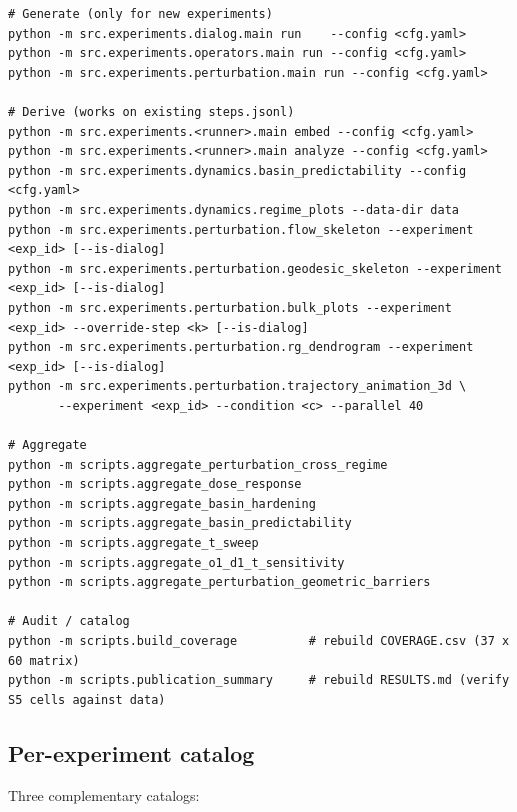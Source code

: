 \documentclass{article}
\theoremstyle{plain}
\theoremstyle{definition}
\begin{document}
\begin{verbatim}
# Generate (only for new experiments)
python -m src.experiments.dialog.main run    --config <cfg.yaml>
python -m src.experiments.operators.main run --config <cfg.yaml>
python -m src.experiments.perturbation.main run --config <cfg.yaml>

# Derive (works on existing steps.jsonl)
python -m src.experiments.<runner>.main embed --config <cfg.yaml>
python -m src.experiments.<runner>.main analyze --config <cfg.yaml>
python -m src.experiments.dynamics.basin_predictability --config <cfg.yaml>
python -m src.experiments.dynamics.regime_plots --data-dir data
python -m src.experiments.perturbation.flow_skeleton --experiment <exp_id> [--is-dialog]
python -m src.experiments.perturbation.geodesic_skeleton --experiment <exp_id> [--is-dialog]
python -m src.experiments.perturbation.bulk_plots --experiment <exp_id> --override-step <k> [--is-dialog]
python -m src.experiments.perturbation.rg_dendrogram --experiment <exp_id> [--is-dialog]
python -m src.experiments.perturbation.trajectory_animation_3d \
       --experiment <exp_id> --condition <c> --parallel 40

# Aggregate
python -m scripts.aggregate_perturbation_cross_regime
python -m scripts.aggregate_dose_response
python -m scripts.aggregate_basin_hardening
python -m scripts.aggregate_basin_predictability
python -m scripts.aggregate_t_sweep
python -m scripts.aggregate_o1_d1_t_sensitivity
python -m scripts.aggregate_perturbation_geometric_barriers

# Audit / catalog
python -m scripts.build_coverage          # rebuild COVERAGE.csv (37 x 60 matrix)
python -m scripts.publication_summary     # rebuild RESULTS.md (verify S5 cells against data)
\end{verbatim}

\subsection{Per-experiment catalog}

Three complementary catalogs:
\end{document}
